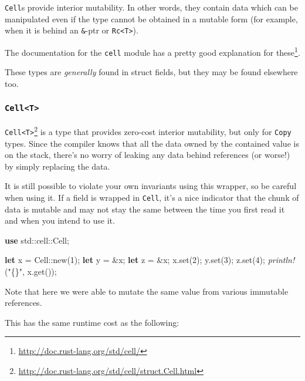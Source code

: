 \documentclass[a4paper,]{book}
\newenvironment{Shaded}{\begin{snugshade}}{\end{snugshade}}
\newcommand{\KeywordTok}[1]{\textcolor[rgb]{0.13,0.29,0.53}{\textbf{{#1}}}}
\newcommand{\DecValTok}[1]{\textcolor[rgb]{0.00,0.00,0.81}{{#1}}}
\newcommand{\StringTok}[1]{\textcolor[rgb]{0.31,0.60,0.02}{{#1}}}
\newcommand{\PreprocessorTok}[1]{\textcolor[rgb]{0.56,0.35,0.01}{\textit{{#1}}}}
\newcommand{\NormalTok}[1]{{#1}}
\renewcommand{\href}[2]{#2\footnote{\url{#1}}}
\begin{document}
\texttt{Cell}s provide interior mutability. In other words, they contain
data which can be manipulated even if the type cannot be obtained in a
mutable form (for example, when it is behind an \texttt{\&}-ptr or
\texttt{Rc\textless{}T\textgreater{}}).

\href{http://doc.rust-lang.org/std/cell/}{The documentation for the
\texttt{cell} module has a pretty good explanation for these}.

These types are \emph{generally} found in struct fields, but they may be
found elsewhere too.

\subsubsection{\texorpdfstring{\texttt{Cell\textless{}T\textgreater{}}}{Cell\textless{}T\textgreater{}}}\label{cellt}

\href{http://doc.rust-lang.org/std/cell/struct.Cell.html}{\texttt{Cell\textless{}T\textgreater{}}}
is a type that provides zero-cost interior mutability, but only for
\texttt{Copy} types. Since the compiler knows that all the data owned by
the contained value is on the stack, there's no worry of leaking any
data behind references (or worse!) by simply replacing the data.

It is still possible to violate your own invariants using this wrapper,
so be careful when using it. If a field is wrapped in \texttt{Cell},
it's a nice indicator that the chunk of data is mutable and may not stay
the same between the time you first read it and when you intend to use
it.

\begin{Shaded}
\begin{Highlighting}[]
\KeywordTok{use} \NormalTok{std::cell::Cell;}

\KeywordTok{let} \NormalTok{x = Cell::new(}\DecValTok{1}\NormalTok{);}
\KeywordTok{let} \NormalTok{y = &x;}
\KeywordTok{let} \NormalTok{z = &x;}
\NormalTok{x.set(}\DecValTok{2}\NormalTok{);}
\NormalTok{y.set(}\DecValTok{3}\NormalTok{);}
\NormalTok{z.set(}\DecValTok{4}\NormalTok{);}
\PreprocessorTok{println!}\NormalTok{(}\StringTok{"\{\}"}\NormalTok{, x.get());}
\end{Highlighting}
\end{Shaded}

Note that here we were able to mutate the same value from various
immutable references.

This has the same runtime cost as the following:
\end{document}

